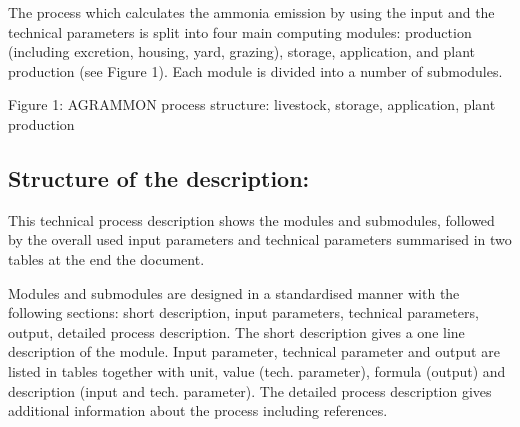 \noindent The process which calculates the ammonia emission by using
the input and the technical parameters is split into four main
computing modules: production (including excretion, housing, yard,
grazing), storage, application, and plant production (see Figure
1). Each module is divided into a number of submodules.


\vspace{12cm}
Figure 1: AGRAMMON process structure: livestock, storage, application, plant production

\subsection{Structure of the description:}

This technical process description shows the modules and submodules,
followed by the overall used input parameters and technical parameters
summarised in two tables at the end the document.

Modules and submodules are designed in a standardised manner with the
following sections: short description, input parameters, technical
parameters, output, detailed process description. The short
description gives a one line description of the module. Input
parameter, technical parameter and output are listed in tables
together with unit, value (tech. parameter), formula (output) and
description (input and tech. parameter). The detailed process
description gives additional information about the process including
references.




